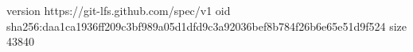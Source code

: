 version https://git-lfs.github.com/spec/v1
oid sha256:daa1ca1936ff209c3bf989a05d1dfd9c3a92036bef8b784f26b6e65e51d9f524
size 43840
